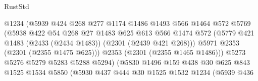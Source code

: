 \begin{lexlean}{RustStd}
\begin{coremodule}
                                    @1234
                                    (@5939
                                      @424
                                      @268
                                      @277
                                      @1174
                                      @1486
                                      @1493
                                      @566
                                      @1464
                                      @572
                                      @5769
                                      (@5938
                                        @422
                                        @54
                                        @268
                                        @27
                                        @1483
                                        @625
                                        @613
                                        @566
                                        @1474
                                        @572
                                        (@5779
                                          @421
                                          @1483
                                          (@2433 (@2434 @1483))
                                          (@2301 (@2439 @421 @268)))
                                        @5971
                                        @2353
                                        (@2301 (@2355 @1475 @625)))
                                      @2353
                                      (@2301 (@2355 @1465 @1486)))
                                    @5273
                                    @5276
                                    @5279
                                    @5283
                                    @5288
                                    @5294)
                                  (@5830
                                    @1496
                                    @159
                                    @438
                                    @30
                                    @625
                                    @843
                                    @1525
                                    @1534
                                    @5850
                                    (@5930
                                      @437
                                      @444
                                      @30
                                      @1525
                                      @1532
                                      @1234
                                      (@5939
                                        @436

\end{coremodule}
\end{lexlean}
